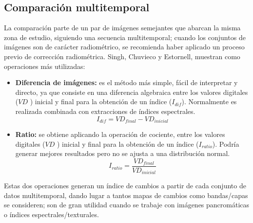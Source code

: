 \subsection{Comparaci\'on multitemporal}
La comparaci\'on parte de un par de im\'agenes semejantes que abarcan la misma zona de estudio, siguiendo una secuencia multitemporal; cuando los conjuntos de im\'agenes son de car\'acter radiom\'etrico, se recomienda haber aplicado un proceso previo de correcci\'on radiom\'etrica. Singh\cite{singh1989review}, Chuvieco\cite{chuvieco1998factor} y Estornell\cite{estornell2004analisis}, muestran como operaciones más utilizadas:
	\begin{itemize}
		\item \textbf{Diferencia de im\'agenes:} es el m\'etodo m\'as simple, f\'acil de interpretar y directo, ya que consiste en una diferencia algebraica entre los valores digitales ($ VD $ ) inicial y final para la obtenci\'on de un \'indice ($ I_{dif} $). Normalmente es realizada combinada  con extracciones de \'indices espectrales.
								\begin{equation}
								I_{dif} = VD_{final}-VD_{inicial}
								\end{equation} 	
				\item \textbf{Ratio:} se obtiene aplicando la operación de cociente, entre los valores digitales ($ VD $ ) inicial y final para la obtenci\'on de un \'indice ($ I_{ratio} $). Podr\'ia  generar mejores resultados pero no se ajusta a una distribución normal.
										\begin{equation}
										I_{ratio} = \dfrac{VD_{final}}{VD_{inicial}}
										\end{equation} 	

		\end{itemize}
Estas dos operaciones generan un \'indice de cambios a partir de cada conjunto de datos multitemporal, dando lugar a tantos mapas de cambios como bandas/capas se consideren; son de gran utilidad cuando se trabaje con im\'agenes pancrom\'aticas o \'indices espectrales/texturales.
